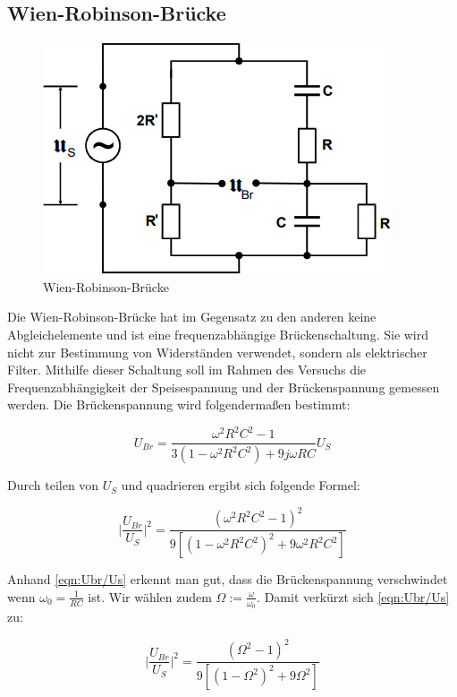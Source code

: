 \documentclass[
  bibliography=totoc,     %
  captions=tableheading,  %
  titlepage=firstiscover, %
]{scrartcl}
\begin{document}
  \subsection{Wien-Robinson-Brücke}

  \begin{figure}
    \centering
    \includegraphics{Wien.png}
    \caption{Wien-Robinson-Brücke \cite{1}}
    \label{Abb:Wien}
  \end{figure}

  Die Wien-Robinson-Brücke hat im Gegensatz zu den anderen keine Abgleichelemente und ist eine frequenzabhängige Brückenschaltung. Sie wird
  nicht zur Bestimmung von Widerständen verwendet, sondern als elektrischer Filter. Mithilfe dieser Schaltung soll im Rahmen des Versuchs die
  Frequenzabhängigkeit der Speisespannung und der Brückenspannung gemessen werden.
  Die Brückenspannung wird folgendermaßen bestimmt:
  
  \begin{equation}
    U_{Br} = \frac{\omega ^2 R^2 C^2 - 1}{3(1- \omega ^2 R^2 C^2) + 9 j \omega RC}U_S
  \end{equation}
  
  Durch teilen von $U_S$ und quadrieren ergibt sich folgende Formel:
  
  \begin{equation}
    \biggl|\frac{U_{Br}}{U_S}\biggl|^2 = \frac{(\omega ^2 R^2 C^2 - 1)^2}{9[(1- \omega ^2 R^2 C^2)^2 + 9 \omega^2 R^2C^2]} \label{eqn:Ubr/Us}
  \end{equation}
  
  Anhand \autoref{eqn:Ubr/Us} erkennt man gut, dass die Brückenspannung verschwindet wenn $\omega_0 = \frac{1}{RC}$ ist. Wir wählen zudem $\Omega := \frac{\omega}{\omega_0}$.
  Damit verkürzt sich \autoref{eqn:Ubr/Us} zu:
  
  \begin{equation}
    \biggl|\frac{U_{Br}}{U_S}\biggl|^2 = \frac{(\Omega ^2 - 1)^2}{9[(1-\Omega ^2)^2 + 9 \Omega ^2]} \label{eqn:Omega}
  \end{equation}
  
\end{document}
